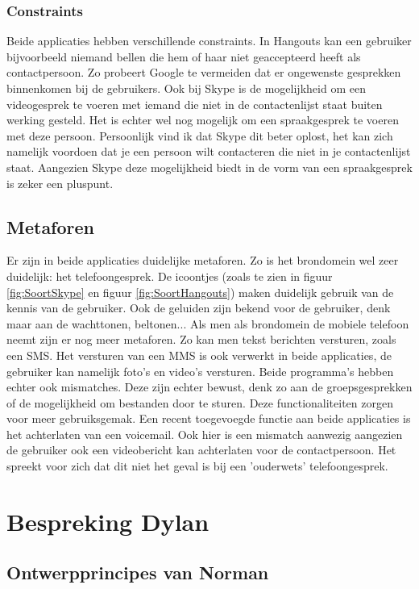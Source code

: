 \documentclass[11pt]{article}
\begin{document}
 \subsubsection{Constraints}
Beide applicaties hebben verschillende constraints. In Hangouts kan een gebruiker bijvoorbeeld niemand bellen die hem of haar niet geaccepteerd heeft als contactpersoon. Zo probeert Google te vermeiden dat er ongewenste gesprekken binnenkomen bij de gebruikers. Ook bij Skype is de mogelijkheid om een videogesprek te voeren met iemand die niet in de contactenlijst staat buiten werking gesteld. Het is echter wel nog mogelijk om een spraakgesprek te voeren met deze persoon. Persoonlijk vind ik dat Skype dit beter oplost, het kan zich namelijk voordoen dat je een persoon wilt contacteren die niet in je contactenlijst staat. Aangezien Skype deze mogelijkheid biedt in de vorm van een spraakgesprek is zeker een pluspunt.
\subsection{Metaforen}
Er zijn in beide applicaties duidelijke metaforen. Zo is het brondomein wel zeer duidelijk: het telefoongesprek. De icoontjes (zoals te zien in figuur \ref{fig:SoortSkype} en figuur \ref{fig:SoortHangouts}) maken duidelijk gebruik van de kennis van de gebruiker. Ook de geluiden zijn bekend voor de gebruiker, denk maar aan de wachttonen, beltonen... 
\newline
Als men als brondomein de mobiele telefoon neemt zijn er nog meer metaforen. Zo kan men tekst berichten versturen, zoals een SMS. Het versturen van een MMS is ook verwerkt in beide applicaties, de gebruiker kan namelijk foto's en video's versturen. 
\newline
Beide programma's hebben echter ook mismatches. Deze zijn echter bewust, denk zo aan de groepsgesprekken of de mogelijkheid om bestanden door te sturen. Deze functionaliteiten zorgen voor meer gebruiksgemak. 
\newline
Een recent toegevoegde functie aan beide applicaties is het achterlaten van een voicemail. Ook hier is een mismatch aanwezig aangezien de gebruiker ook een videobericht kan achterlaten voor de contactpersoon. Het spreekt voor zich dat dit niet het geval is bij een 'ouderwets' telefoongesprek.
\newpage

\section{Bespreking Dylan}
\subsection{Ontwerpprincipes van Norman}
\end{document}
